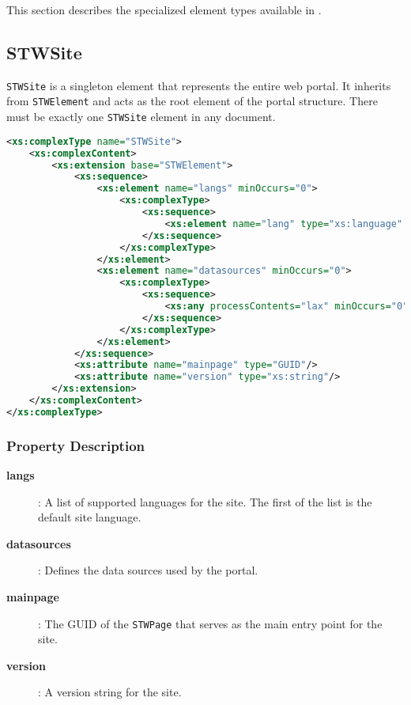 This section describes the specialized element types available in \wbdl{}.

\subsection{STWSite}

\texttt{STWSite} is a singleton element that represents the entire web portal. It inherits from \texttt{STWElement} and acts as the root element of the portal structure. There must be exactly one \texttt{STWSite} element in any \wbdl{} document.

\begin{lstlisting}[language=XML,caption={STWSite Type Definition}]
<xs:complexType name="STWSite">
    <xs:complexContent>
        <xs:extension base="STWElement">
            <xs:sequence>
                <xs:element name="langs" minOccurs="0">
                    <xs:complexType>
                        <xs:sequence>
                            <xs:element name="lang" type="xs:language" maxOccurs="unbounded"/>
                        </xs:sequence>
                    </xs:complexType>
                </xs:element>
                <xs:element name="datasources" minOccurs="0">
                    <xs:complexType>
                        <xs:sequence>
                            <xs:any processContents="lax" minOccurs="0" maxOccurs="unbounded"/>
                        </xs:sequence>
                    </xs:complexType>
                </xs:element>
            </xs:sequence>
            <xs:attribute name="mainpage" type="GUID"/>
            <xs:attribute name="version" type="xs:string"/>
        </xs:extension>
    </xs:complexContent>
</xs:complexType>
\end{lstlisting}

\subsubsection{Property Description}

\begin{description}
\item[\textbf{langs}]: A list of supported languages for the site. The first of the list is the default site language.
\item[\textbf{datasources}]: Defines the data sources used by the portal.
\item[\textbf{mainpage}]: The GUID of the \texttt{STWPage} that serves as the main entry point for the site.
\item[\textbf{version}]: A version string for the site.
\end{description}

